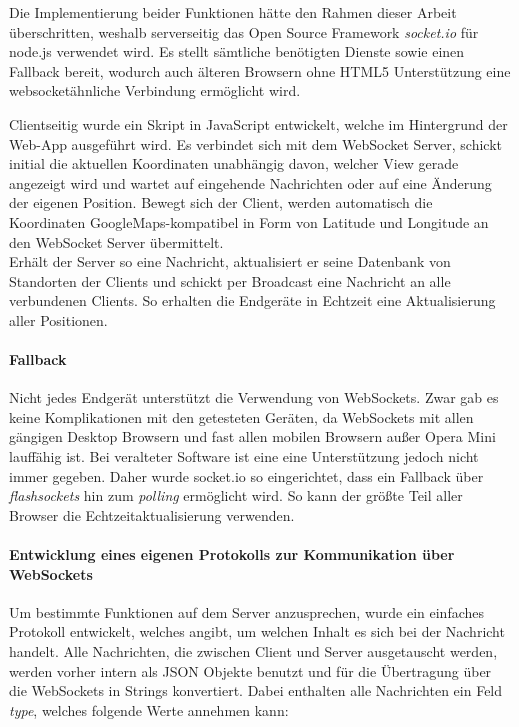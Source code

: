 Die Implementierung beider Funktionen hätte den Rahmen dieser Arbeit überschritten, weshalb serverseitig das Open Source Framework \emph{socket.io} für node.js verwendet wird. Es stellt sämtliche benötigten Dienste sowie einen Fallback bereit, wodurch auch älteren Browsern ohne HTML5 Unterstützung eine websocketähnliche Verbindung ermöglicht wird.\par

Clientseitig wurde ein Skript in JavaScript entwickelt, welche im Hintergrund der Web-App ausgeführt wird. Es verbindet sich mit dem WebSocket Server, schickt initial die aktuellen Koordinaten unabhängig davon, welcher View gerade angezeigt wird und wartet auf eingehende Nachrichten oder auf eine Änderung der eigenen Position. Bewegt sich der Client, werden automatisch die Koordinaten GoogleMaps-kompatibel in Form von Latitude und Longitude an den WebSocket Server übermittelt.\\
Erhält der Server so eine Nachricht, aktualisiert er seine Datenbank von Standorten der Clients und schickt per Broadcast eine Nachricht an alle verbundenen Clients. So erhalten die Endgeräte in Echtzeit eine Aktualisierung aller Positionen.

\paragraph{Fallback}
Nicht jedes Endgerät unterstützt die Verwendung von WebSockets. Zwar gab es keine Komplikationen mit den getesteten Geräten, da WebSockets mit allen gängigen Desktop Browsern und fast allen mobilen Browsern außer Opera Mini lauffähig ist. Bei veralteter Software ist eine eine Unterstützung jedoch nicht immer gegeben. Daher wurde socket.io so eingerichtet, dass ein Fallback über \emph{flashsockets} hin zum \emph{polling} ermöglicht wird. So kann der größte Teil aller Browser die Echtzeitaktualisierung verwenden.

\paragraph{Entwicklung eines eigenen Protokolls zur Kommunikation über WebSockets}
Um bestimmte Funktionen auf dem Server anzusprechen, wurde ein einfaches Protokoll entwickelt, welches angibt, um welchen Inhalt es sich bei der Nachricht handelt. Alle Nachrichten, die zwischen Client und Server ausgetauscht werden, werden vorher intern als JSON Objekte benutzt und für die Übertragung über die WebSockets in Strings konvertiert. Dabei enthalten alle Nachrichten ein Feld \emph{type}, welches folgende Werte annehmen kann:

